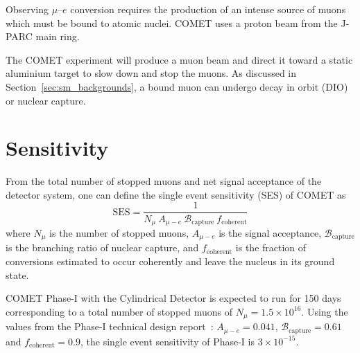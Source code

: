 Observing $\mu$--$e$ conversion requires the production of an intense source of
muons which must be bound to atomic nuclei. COMET uses a proton beam from the
J-PARC main ring.


The COMET experiment will produce a muon beam and direct it toward a static
aluminium target to slow down and stop the muons. As discussed in
Section~\ref{sec:sm_backgrounds}, a bound muon can undergo decay in orbit (DIO)
or nuclear capture.


\section{Sensitivity}\label{sec:SES}

From the total number of stopped muons and net signal acceptance of the detector
system, one can define the single event sensitivity (SES) of COMET as
\begin{equation}
    \mathrm{SES} = \frac{1}{N_\mu \  A_{\mu-e} \  
    \mathcal{B}_\mathrm{capture} \  f_\mathrm{coherent}}
\end{equation}
where $N_\mu$ is the number of stopped muons, $A_{\mu-e}$ is the signal
acceptance, $\mathcal{B}_\mathrm{capture}$ is the branching ratio of nuclear
capture, and $f_\mathrm{coherent}$ is the fraction of conversions estimated to
occur coherently and leave the nucleus in its ground state.

COMET Phase-I with the Cylindrical Detector is expected to run for 150 days
corresponding to a total number of stopped muons of $N_\mu = 1.5 \times
10^{16}$. Using the values from the Phase-I technical design
report~\cite{the_comet_collaboration_comet_2020}: $A_{\mu-e} = 0.041$,
$\mathcal{B}_\mathrm{capture} = 0.61$ and $f_\mathrm{coherent} = 0.9$, the
single event sensitivity of Phase-I is $3 \times 10^{-15}$.






